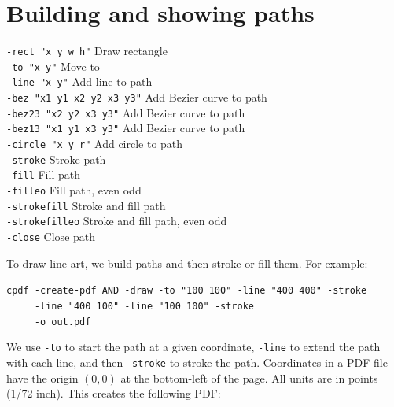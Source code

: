 \documentclass{book}
\begin{document}
\section{Building and showing paths}

  {\small\begin{framed}
   \noindent\verb!-rect "x y w h"! Draw rectangle\\
   \noindent\verb!-to "x y"! Move to\\
   \noindent\verb!-line "x y"! Add line to path\\
   \noindent\verb!-bez "x1 y1 x2 y2 x3 y3"! Add Bezier curve to path\\
   \noindent\verb!-bez23 "x2 y2 x3 y3"! Add Bezier curve to path\\
   \noindent\verb!-bez13 "x1 y1 x3 y3"! Add Bezier curve to path\\
   \noindent\verb!-circle "x y r"! Add circle to path\\
   \noindent\verb!-stroke! Stroke path\\
   \noindent\verb!-fill! Fill path\\
   \noindent\verb!-filleo! Fill path, even odd\\
   \noindent\verb!-strokefill! Stroke and fill path\\
   \noindent\verb!-strokefilleo! Stroke and fill path, even odd\\
   \noindent\verb!-close! Close path
  \end{framed}}

\noindent  To draw line art, we build paths and then stroke or fill them. For example:

\begin{framed}
 \noindent\small\verb?cpdf -create-pdf AND -draw -to "100 100" -line "400 400" -stroke?\\
 \noindent\small\verb?     -line "400 100" -line "100 100" -stroke?\\
 \noindent\small\verb?     -o out.pdf?
\end{framed}

\noindent We use \texttt{-to} to start the path at a given coordinate, \texttt{-line} to extend the path with each line, and then \texttt{-stroke} to stroke the path. Coordinates in a PDF file have the origin $(0, 0)$ at the bottom-left of the page. All units are in points (1/72 inch). This creates the following PDF:

\bigskip
{}
\bigskip
\end{document}
